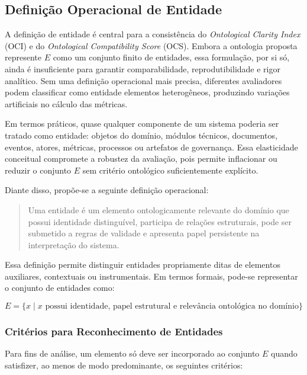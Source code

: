 \documentclass[12pt,a4paper]{article}
\begin{document}
\subsection{Definição Operacional de Entidade}

A definição de entidade é central para a consistência do \textit{Ontological Clarity Index} (OCI) e do \textit{Ontological Compatibility Score} (OCS). Embora a ontologia proposta represente \(E\) como um conjunto finito de entidades, essa formulação, por si só, ainda é insuficiente para garantir comparabilidade, reprodutibilidade e rigor analítico. Sem uma definição operacional mais precisa, diferentes avaliadores podem classificar como entidade elementos heterogêneos, produzindo variações artificiais no cálculo das métricas.

Em termos práticos, quase qualquer componente de um sistema poderia ser tratado como entidade: objetos do domínio, módulos técnicos, documentos, eventos, atores, métricas, processos ou artefatos de governança. Essa elasticidade conceitual compromete a robustez da avaliação, pois permite inflacionar ou reduzir o conjunto \(E\) sem critério ontológico suficientemente explícito.

Diante disso, propõe-se a seguinte definição operacional:

\begin{quote}
	Uma entidade é um elemento ontologicamente relevante do domínio que possui identidade distinguível, participa de relações estruturais, pode ser submetido a regras de validade e apresenta papel persistente na interpretação do sistema.
\end{quote}

Essa definição permite distinguir entidades propriamente ditas de elementos auxiliares, contextuais ou instrumentais. Em termos formais, pode-se representar o conjunto de entidades como:

\[
E = \{x \mid x \text{ possui identidade, papel estrutural e relevância ontológica no domínio}\}
\]

\subsubsection{Critérios para Reconhecimento de Entidades}

Para fins de análise, um elemento só deve ser incorporado ao conjunto \(E\) quando satisfizer, ao menos de modo predominante, os seguintes critérios:
\end{document}
